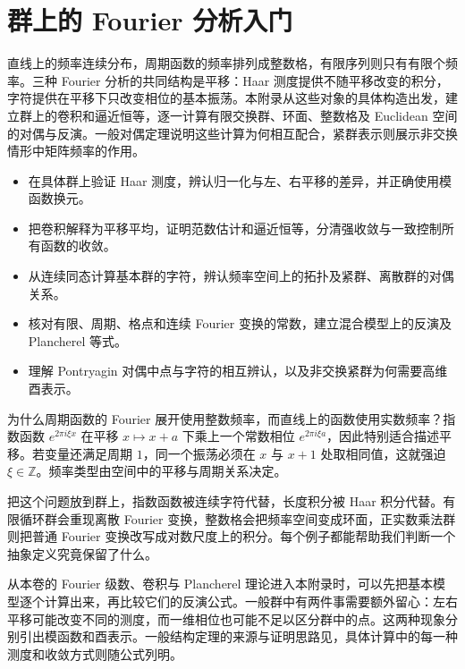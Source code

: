 \chapter{群上的 Fourier 分析入门}
\label{b2:app:I}

\begin{chapterabstract}
直线上的频率连续分布，周期函数的频率排列成整数格，有限序列则只有有限个频率。三种 Fourier 分析的共同结构是平移：Haar 测度提供不随平移改变的积分，字符提供在平移下只改变相位的基本振荡。本附录从这些对象的具体构造出发，建立群上的卷积和逼近恒等，逐一计算有限交换群、环面、整数格及 Euclidean 空间的对偶与反演。一般对偶定理说明这些计算为何相互配合，紧群表示则展示非交换情形中矩阵频率的作用。
\end{chapterabstract}

\begin{learninggoals}
\begin{itemize}
\item\label{b2:item:I2-goal-1}在具体群上验证 Haar 测度，辨认归一化与左、右平移的差异，并正确使用模函数换元。
\item\label{b2:item:I2-goal-2}把卷积解释为平移平均，证明范数估计和逼近恒等，分清强收敛与一致控制所有函数的收敛。
\item\label{b2:item:I2-goal-3}从连续同态计算基本群的字符，辨认频率空间上的拓扑及紧群、离散群的对偶关系。
\item\label{b2:item:I2-goal-4}核对有限、周期、格点和连续 Fourier 变换的常数，建立混合模型上的反演及 Plancherel 等式。
\item\label{b2:item:I2-goal-5}理解 Pontryagin 对偶中点与字符的相互辨认，以及非交换紧群为何需要高维酉表示。
\end{itemize}
\end{learninggoals}

为什么周期函数的 Fourier 展开使用整数频率，而直线上的函数使用实数频率？指数函数 \(e^{2\pi i\xi x}\) 在平移 \(x\mapsto x+a\) 下乘上一个常数相位 \(e^{2\pi i\xi a}\)，因此特别适合描述平移。若变量还满足周期 \(1\)，同一个振荡必须在 \(x\) 与 \(x+1\) 处取相同值，这就强迫 \(\xi\in\mathbb Z\)。频率类型由空间中的平移与周期关系决定。

\ProseParagraphBreak
把这个问题放到群上，指数函数被连续字符代替，长度积分被 Haar 积分代替。有限循环群会重现离散 Fourier 变换，整数格会把频率空间变成环面，正实数乘法群则把普通 Fourier 变换改写成对数尺度上的积分。每个例子都能帮助我们判断一个抽象定义究竟保留了什么。

\ProseParagraphBreak
从本卷的 Fourier 级数、卷积与 Plancherel 理论进入本附录时，可以先把基本模型逐个计算出来，再比较它们的反演公式。一般群中有两件事需要额外留心：左右平移可能改变不同的测度，而一维相位也可能不足以区分群中的点。这两种现象分别引出模函数和酉表示。一般结构定理的来源与证明思路见，具体计算中的每一种测度和收敛方式则随公式列明。

